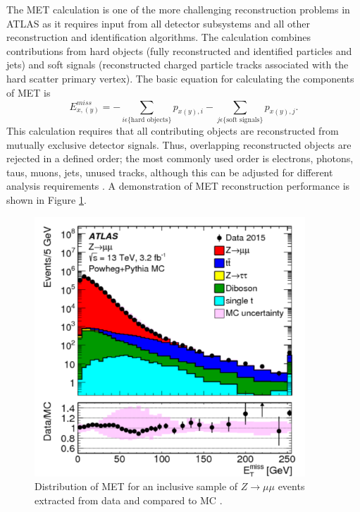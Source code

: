 The MET calculation is one of the more challenging reconstruction problems in ATLAS as it requires input from all detector subsystems and all other reconstruction and identification algorithms. The calculation combines contributions from hard objects (fully reconstructed and identified particles and jets) and soft signals (reconstructed charged particle tracks associated with the hard scatter primary vertex). The basic equation for calculating the components of MET is $$E_{x,(y)}^{miss}=-\sum_{i\epsilon\{\text{hard objects}\}}p_{x(y),i}-\sum_{j\epsilon\{\text{soft signals}\}}p_{x(y),j}.$$ This calculation requires that all contributing objects are reconstructed from mutually exclusive detector signals. Thus, overlapping reconstructed objects are rejected in a defined order; the most commonly used order is electrons, photons, taus, muons, jets, unused tracks, although this can be adjusted for different analysis requirements \cite{met_run2}. A demonstration of MET reconstruction performance is shown in Figure \ref{fig:met_eff}.\\

\begin{figure}[htb!]
    \centering
    \includegraphics[width=4in]{figures/chapter3/met_eff.pdf}
    \caption{Distribution of MET for an inclusive sample of $Z\rightarrow\mu\mu$ events extracted from data and compared to MC \cite{met_run2}.}
    \label{fig:met_eff}
\end{figure}